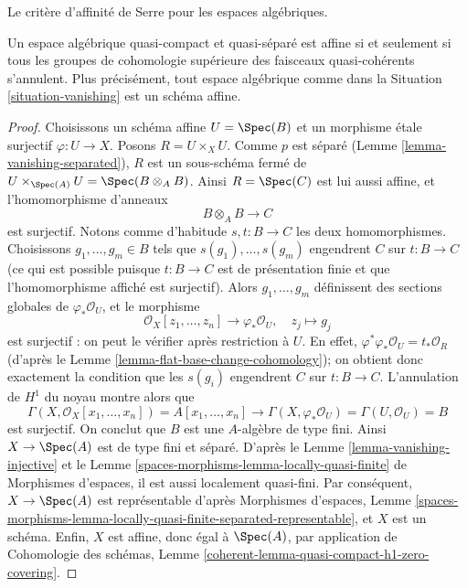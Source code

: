 \begin{proposition}
\label{proposition-vanishing-affine}
\begin{slogan}
Le critère d'affinité de Serre pour les espaces algébriques.
\end{slogan}
Un espace algébrique quasi-compact et quasi-séparé est affine
si et seulement si tous les groupes de cohomologie supérieure des faisceaux quasi-cohérents
s'annulent. Plus précisément, tout espace algébrique comme dans la
Situation \ref{situation-vanishing} est un schéma affine.
\end{proposition}

\begin{proof}
Choisissons un schéma affine $U = \Spec(B)$ et un morphisme \'etale surjectif
$\varphi : U \to X$. Posons $R = U \times_X U$. Comme $p$ est séparé
(Lemme \ref{lemma-vanishing-separated}), $R$ est un
sous-schéma fermé de $U \times_{\Spec(A)} U = \Spec(B \otimes_A B)$.
Ainsi $R = \Spec(C)$ est lui aussi affine, et l'homomorphisme d'anneaux
$$
B \otimes_A B \longrightarrow C
$$
est surjectif. Notons comme d'habitude $s, t : B \to C$ les deux homomorphismes. Choisissons
$g_1, \ldots, g_m \in B$ tels que $s(g_1), \ldots, s(g_m)$ engendrent $C$
sur $t : B \to C$ (ce qui est possible puisque $t : B \to C$ est de présentation
finie et que l'homomorphisme affiché est surjectif). Alors $g_1, \ldots, g_m$
définissent des sections globales de $\varphi_*\mathcal{O}_U$, et le morphisme
$$
\mathcal{O}_X[z_1, \ldots, z_n] \longrightarrow \varphi_*\mathcal{O}_U,
\quad
z_j \longmapsto g_j
$$
est surjectif : on peut le vérifier après restriction à $U$.
En effet, $\varphi^*\varphi_*\mathcal{O}_U = t_*\mathcal{O}_R$
(d'après le Lemme \ref{lemma-flat-base-change-cohomology});
on obtient donc exactement la condition que les $s(g_i)$ engendrent $C$
sur $t : B \to C$. L'annulation de $H^1$ du noyau montre alors que
$$
\Gamma(X, \mathcal{O}_X[x_1, \ldots, x_n]) =
A[x_1, \ldots, x_n] \longrightarrow
\Gamma(X, \varphi_*\mathcal{O}_U) = \Gamma(U, \mathcal{O}_U) = B
$$
est surjectif. On conclut que $B$ est une $A$-algèbre de type fini.
Ainsi $X \to \Spec(A)$ est de type fini et séparé.
D'après le Lemme \ref{lemma-vanishing-injective}
et le
Lemme \ref{spaces-morphisms-lemma-locally-quasi-finite} de Morphismes d'espaces,
il est aussi localement quasi-fini. Par conséquent, $X \to \Spec(A)$ est représentable d'après
Morphismes d'espaces, Lemme
\ref{spaces-morphisms-lemma-locally-quasi-finite-separated-representable},
et $X$ est un schéma. Enfin, $X$ est affine, donc égal à $\Spec(A)$,
par application de Cohomologie des schémas, Lemme
\ref{coherent-lemma-quasi-compact-h1-zero-covering}.
\end{proof}

